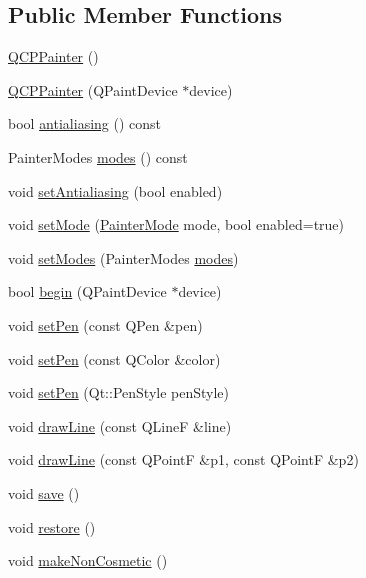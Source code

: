 \subsection*{Public Member Functions}
\begin{DoxyCompactItemize}
\item 
\mbox{\hyperlink{class_q_c_p_painter_a3c52cb0f43f34573d29bea487da28fe8}{Q\+C\+P\+Painter}} ()
\item 
\mbox{\hyperlink{class_q_c_p_painter_ae58dbb1795ddc4351ab324dc9898aa22}{Q\+C\+P\+Painter}} (Q\+Paint\+Device $\ast$device)
\item 
bool \mbox{\hyperlink{class_q_c_p_painter_a5aff96296e995f6f35b2596a482aae37}{antialiasing}} () const
\item 
Painter\+Modes \mbox{\hyperlink{class_q_c_p_painter_aef102658219b24165f7ee2aad1b9e48f}{modes}} () const
\item 
void \mbox{\hyperlink{class_q_c_p_painter_aaba1deb9188244d9ea65b035112b4d05}{set\+Antialiasing}} (bool enabled)
\item 
void \mbox{\hyperlink{class_q_c_p_painter_af6b1f7d2bbc548b10aa55d8b6ad49577}{set\+Mode}} (\mbox{\hyperlink{class_q_c_p_painter_a156cf16444ff5e0d81a73c615fdb156d}{Painter\+Mode}} mode, bool enabled=true)
\item 
void \mbox{\hyperlink{class_q_c_p_painter_a5fac93adc29c7c4dea9f3e171e9e635e}{set\+Modes}} (Painter\+Modes \mbox{\hyperlink{class_q_c_p_painter_aef102658219b24165f7ee2aad1b9e48f}{modes}})
\item 
bool \mbox{\hyperlink{class_q_c_p_painter_a0a41146ccd619dceab6e25ec7b46b044}{begin}} (Q\+Paint\+Device $\ast$device)
\item 
void \mbox{\hyperlink{class_q_c_p_painter_af9c7a4cd1791403901f8c5b82a150195}{set\+Pen}} (const Q\+Pen \&pen)
\item 
void \mbox{\hyperlink{class_q_c_p_painter_a5c4d88f21564e156e88ef807f7cf0003}{set\+Pen}} (const Q\+Color \&color)
\item 
void \mbox{\hyperlink{class_q_c_p_painter_a25e76095aae41da0d08035060e5f81ca}{set\+Pen}} (Qt\+::\+Pen\+Style pen\+Style)
\item 
void \mbox{\hyperlink{class_q_c_p_painter_a0b4b1b9bd495e182c731774dc800e6e0}{draw\+Line}} (const Q\+LineF \&line)
\item 
void \mbox{\hyperlink{class_q_c_p_painter_ad1638db27929491b3f1beb74d6cbad5e}{draw\+Line}} (const Q\+PointF \&p1, const Q\+PointF \&p2)
\item 
void \mbox{\hyperlink{class_q_c_p_painter_a8fd6821ee6fecbfa04444c9062912abd}{save}} ()
\item 
void \mbox{\hyperlink{class_q_c_p_painter_a64908e6298d5bbd83457dc987cc3a022}{restore}} ()
\item 
void \mbox{\hyperlink{class_q_c_p_painter_a7e63fbcf47e35c6f2ecd11b8fef7c7d8}{make\+Non\+Cosmetic}} ()
\end{DoxyCompactItemize}
